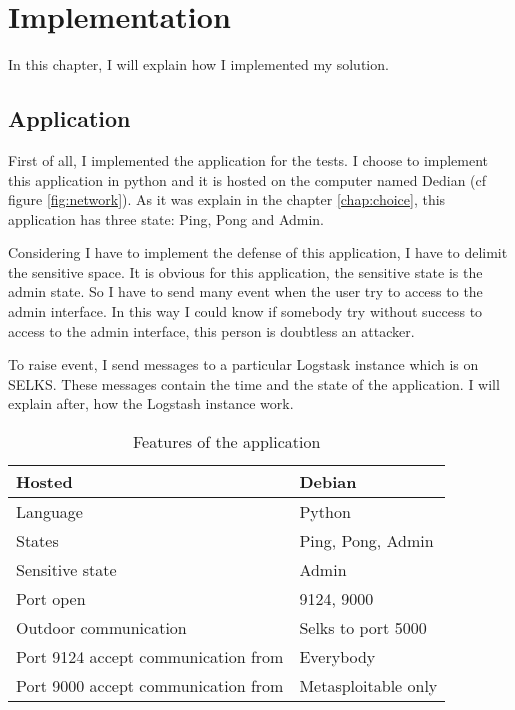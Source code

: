 
\chapter{Implementation}

In this chapter, I will explain how I implemented my solution.

\section{Application}

First of all, I implemented the application for the tests. I choose to implement this application in python and it
is hosted on the computer named Dedian (cf figure \ref{fig:network}). As it was explain in the chapter
\ref{chap:choice}, this application has three state: Ping, Pong and Admin.

Considering I have to implement the defense of this application, I have to delimit the sensitive space. It is
obvious for this application, the sensitive state is the admin state. So I have to send many event when the user
try to access to the admin interface. In this way I could know if somebody try without success to access to the
admin interface, this person is doubtless an attacker.

To raise event, I send messages to a particular Logstask instance which is on SELKS. These messages contain the
time and the state of the application. I will explain after, how the Logstash instance work.

\begin{table}[h]
  \centering
  \begin{tabularx}{1.0\linewidth}{|X|X|}
    \hline
    Hosted&Debian\\
    \hline
    Language & Python \\
    \hline
    States & Ping, Pong, Admin \\
    \hline
    Sensitive state & Admin \\
    \hline
    Port open & 9124, 9000\\
    \hline
    Outdoor communication & Selks to port 5000 \\
    \hline
    Port 9124 accept communication from & Everybody \\
    \hline
    Port 9000 accept communication from & Metasploitable only\\
    \hline
  \end{tabularx}
  \caption{Features of the application}
  \label{tab:carac}
\end{table}



